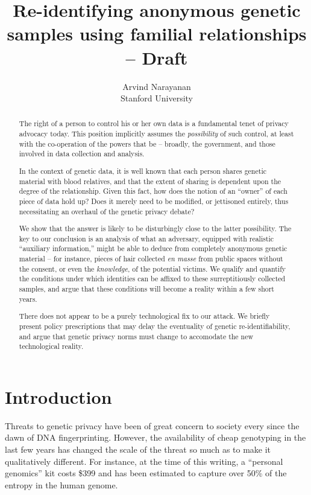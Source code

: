 \documentclass{article}
\title{Re-identifying anonymous genetic samples using familial relationships -- Draft}
\author{Arvind Narayanan \\
{\small Stanford University}}
\begin{document}
\maketitle




\begin{abstract}
The right of a person to control his or her own data is a fundamental tenet of privacy advocacy today. This position implicitly assumes the {\em possibility} of such control, at least with the co-operation of the powers that be -- broadly, the government, and those involved in data collection and analysis.

In the context of genetic data, it is well known that each person shares genetic material with blood relatives, and that the extent of sharing is dependent upon the degree of the relationship. Given this fact, how does the notion of an ``owner'' of each piece of data hold up? Does it merely need to be modified, or jettisoned entirely, thus necessitating an overhaul of the genetic privacy debate?

We show that the answer is likely to be disturbingly close to the latter possibility. The key to our conclusion is an analysis of what an adversary, equipped with realistic ``auxiliary information,'' might be able to deduce from completely anonymous genetic material -- for instance, pieces of hair collected {\em en masse} from public spaces without the consent, or even the {\em knowledge}, of the potential victims. We qualify and quantify the conditions under which identities can be affixed to these surreptitiously collected samples, and argue that these conditions will become a reality within a few short years.

There does not appear to be a purely technological fix to our attack. We briefly present policy prescriptions that may delay the eventuality of genetic re-identifiability, and argue that genetic privacy norms must change to accomodate the new technological reality.
\end{abstract}

\section{Introduction}

Threats to genetic privacy have been of great concern to society every since the dawn of DNA fingerprinting. However, the availability of cheap genotyping in the last few years has changed the scale of the threat so much as to make it qualitatively different. For instance, at the time of this writing, a ``personal genomics'' kit costs \$399 \cite{23-and-me} and has been estimated to capture over 50\% of the entropy in the human genome.
\end{document}
